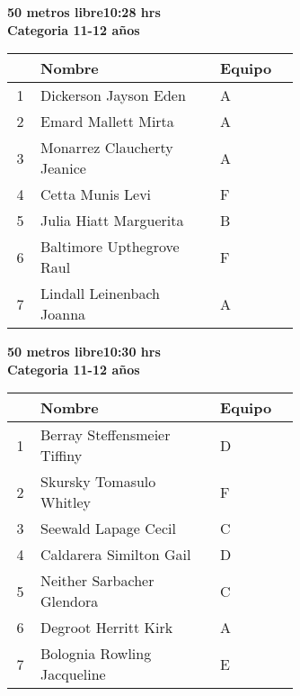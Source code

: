 \begin{minipage}{0.95\linewidth}\vspace{0.5cm} 
\begin{flushleft}
\textbf{
\hspace{-0.15cm}50 metros libre\hspace{1.5cm}10:28 hrs \\Categoria 11-12 años}\vspace{-0.2cm} 
\end{flushleft}
\begin{tabular}{cp{0.63\linewidth}l}
\hline
& \textbf{Nombre} & \textbf{Equipo} \\ \hline
1 & Dickerson Jayson Eden & A \\ 
2 & Emard Mallett Mirta & A \\ 
3 & Monarrez Claucherty Jeanice & A \\ 
4 & Cetta Munis Levi & F \\ 
5 & Julia Hiatt Marguerita & B \\ 
6 & Baltimore Upthegrove Raul & F \\ 
7 & Lindall Leinenbach Joanna & A \\ 
\end{tabular}
\end{minipage}
\begin{minipage}{0.95\linewidth}\vspace{0.5cm} 
\begin{flushleft}
\textbf{
\hspace{-0.15cm}50 metros libre\hspace{1.5cm}10:30 hrs \\Categoria 11-12 años}\vspace{-0.2cm} 
\end{flushleft}
\begin{tabular}{cp{0.63\linewidth}l}
\hline
& \textbf{Nombre} & \textbf{Equipo} \\ \hline
1 & Berray Steffensmeier Tiffiny & D \\ 
2 & Skursky Tomasulo Whitley & F \\ 
3 & Seewald Lapage Cecil & C \\ 
4 & Caldarera Similton Gail & D \\ 
5 & Neither Sarbacher Glendora & C \\ 
6 & Degroot Herritt Kirk & A \\ 
7 & Bolognia Rowling Jacqueline & E \\ 
\end{tabular}
\end{minipage}
